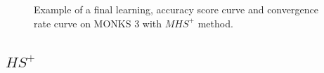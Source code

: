 \begin{appendices}
\begin{figure}[H]
\begin{subfigure}{0.40\textwidth}
                    \label{fig:monks_3_ACC_CGD}
                \end{subfigure}
                \begin{subfigure}{0.40\textwidth}
                    \caption{}
                    \label{fig:monks_3_NORM_CGD}
                \end{subfigure}
                \caption{Example of a final learning, accuracy score curve and
                convergence rate curve on MONKS 3 with $MHS^+$ method.}
                \label{fig:monks_3_CGD}
            \end{figure}




            \subsection{$HS^+$} %
            \label{sub:hs}


\end{appendices}
